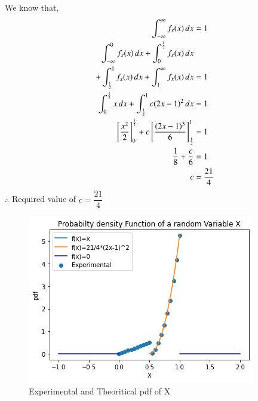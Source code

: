 We know that,
\begin{align}
\int_{-\infty}^{\infty}{f_x(x)}\,dx &= 1\\
    \int_{-\infty}^{0}{f_x(x)}\,dx +\int_{0}^{\frac{1}{2}}{f_x(x)}\,dx&\nonumber\\ +\int_{\frac{1}{2}}^{1}{f_x(x)}\,dx +\int_{1}^{\infty}{f_x(x)}\,dx&=1\\
    \int_{0}^{\frac{1}{2}}x\,dx+\int_{\frac{1}{2}}^{1}c(2x-1)^2\,dx&=1\\
    {}\left[\dfrac{x^2}{2}\right]_0^\frac{1}{2}+c {}\left[\dfrac{(2x-1)^3}{6}\right]_\frac{1}{2}^1&=1\\
    \dfrac{1}{8}+\dfrac{c}{6}&=1\\
    c&=\dfrac{21}{4}
\end{align}
\hspace{2cm}$\therefore$ Required value of $c=\dfrac{21}{4}$

\begin{figure}[h]
   \includegraphics[width=\linewidth]{solutions/ma/2016/10/figures/plot.png}
    \caption{Experimental and Theoritical pdf of X}
    \label{fig:my_label}
\end{figure}



